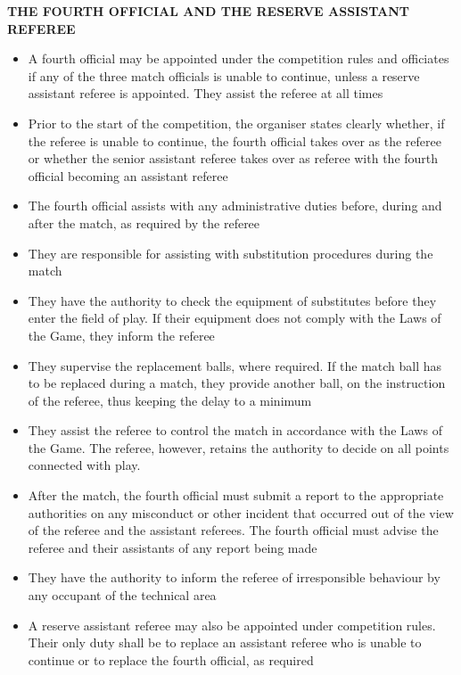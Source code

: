 \clearpage
\sffamily
{\bfseries\color[rgb]{0.4,0.4,0.4}THE FOURTH OFFICIAL AND THE RESERVE ASSISTANT REFEREE}
{}

\bigskip

\begin{itemize}
\item A fourth official may be appointed under the competition rules and officiates if any of the three match officials is unable to continue, unless a reserve assistant referee is appointed. They assist the referee at all times
\item Prior to the start of the competition, the organiser states clearly whether, if the referee is unable to continue, the fourth official takes over as the referee or whether the senior assistant referee takes over as referee with the fourth official becoming an assistant referee
\item The fourth official assists with any administrative duties before, during and after the match, as required by the referee
\item They are responsible for assisting with substitution procedures during the match
\item They have the authority to check the equipment of substitutes before they enter the field of play. If their equipment does not comply with the Laws of the Game, they inform the referee
\item They supervise the replacement balls, where required. If the match ball has to be replaced during a match, they provide another ball, on the instruction of the referee, thus keeping the delay to a minimum
\item They assist the referee to control the match in accordance with the Laws of the Game. The referee, however, retains the authority to decide on
all points connected with play.
\item After the match, the fourth official must submit a report to the appropriate authorities on any misconduct or other incident that occurred out of the view of the referee and the assistant referees. The fourth official must advise the referee and their assistants of any report being made
\item They have the authority to inform the referee of irresponsible behaviour by any occupant of the technical area
\item A reserve assistant referee may also be appointed under competition rules. Their only duty shall be to replace an assistant referee who is unable to continue or to replace the fourth official, as required
\end{itemize}

